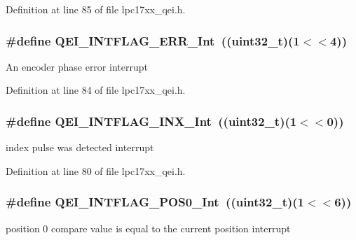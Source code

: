 \-Definition at line 85 of file lpc17xx\-\_\-qei.\-h.

\hypertarget{group___q_e_i___public___macros_gad96bfe0b2bd133ccda2fb2a16b99ec28}{
\subsubsection[{\-Q\-E\-I\-\_\-\-I\-N\-T\-F\-L\-A\-G\-\_\-\-E\-R\-R\-\_\-\-Int}]{\setlength{\rightskip}{0pt plus 5cm}\#define {\bf \-Q\-E\-I\-\_\-\-I\-N\-T\-F\-L\-A\-G\-\_\-\-E\-R\-R\-\_\-\-Int}~((uint32\-\_\-t)(1$<$$<$4))}}\label{group___q_e_i___public___macros_gad96bfe0b2bd133ccda2fb2a16b99ec28}
\-An encoder phase error interrupt 

\-Definition at line 84 of file lpc17xx\-\_\-qei.\-h.

\hypertarget{group___q_e_i___public___macros_ga3a8dcf67a425102120d1ace7fc04a5df}{
\subsubsection[{\-Q\-E\-I\-\_\-\-I\-N\-T\-F\-L\-A\-G\-\_\-\-I\-N\-X\-\_\-\-Int}]{\setlength{\rightskip}{0pt plus 5cm}\#define {\bf \-Q\-E\-I\-\_\-\-I\-N\-T\-F\-L\-A\-G\-\_\-\-I\-N\-X\-\_\-\-Int}~((uint32\-\_\-t)(1$<$$<$0))}}\label{group___q_e_i___public___macros_ga3a8dcf67a425102120d1ace7fc04a5df}
index pulse was detected interrupt 

\-Definition at line 80 of file lpc17xx\-\_\-qei.\-h.

\hypertarget{group___q_e_i___public___macros_gaa60bdc4e3ce4eb5ec1bda5141d4b0e87}{
\subsubsection[{\-Q\-E\-I\-\_\-\-I\-N\-T\-F\-L\-A\-G\-\_\-\-P\-O\-S0\-\_\-\-Int}]{\setlength{\rightskip}{0pt plus 5cm}\#define {\bf \-Q\-E\-I\-\_\-\-I\-N\-T\-F\-L\-A\-G\-\_\-\-P\-O\-S0\-\_\-\-Int}~((uint32\-\_\-t)(1$<$$<$6))}}\label{group___q_e_i___public___macros_gaa60bdc4e3ce4eb5ec1bda5141d4b0e87}
position 0 compare value is equal to the current position interrupt 

